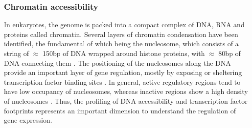 

\subsubsection{Chromatin accessibility} \label{section:chromatin_accessibility}

In eukaryotes, the genome is packed into a compact complex of DNA, RNA and proteins called chromatin. Several layers of chromatin condensation have been identified, the fundamental of which being the nucleosome, which consists of a string of $\approx$  150bp of DNA wrapped around histone proteins, with $\approx$ 80bp of DNA connecting them \cite{Klemm2019,Tsompana2014}. The positioning of the nucleosomes along the DNA provide an important layer of gene regulation, mostly by exposing or sheltering transcription factor binding sites \cite{Jiang2009}. In general, active regulatory regions tend to have low occupancy of nucleosomes, whereas inactive regions show a high density of nucleosomes \cite{Struhl2013}. Thus, the profiling of DNA accessibility and transcription factor footprints represents an important dimension to understand the regulation of gene expression.


